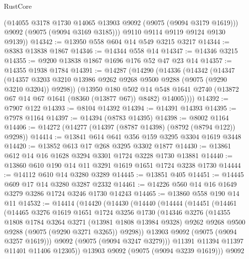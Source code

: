 \begin{lexlean}{RustCore}
\begin{coremodule}
          (@14055 @3178 @1730 @14065 @13903 @9092 (@9075 (@9094 @3179 @1619)))
          @9092
          (@9075 (@9094 @3169 @3185)))
        @9110
        @9114
        @9119
        @9124
        @9130
        @9139))
@14342 := @13950 @558 @604 @14 @549 @3215 @3217
@14344 := @8383 @13838 @1867
@14346 := @14344 @558 @14
@14347 := @14346 @3215
@14355 := @9200 @13838 @1867 @1696 @176 @52 @47 @23 @14
@14357 := @14355 @1938 @1784
@14391 := @14287
    (@14290
      (@14336
        (@14342
          (@14347
            (@14357 @3203 @3210 @13986 @9262 @9268 @9500 @9288 (@9075 (@9290 @3210 @3204)) @9298))
          (@13950
            @180
            @502
            @14
            @548
            @1641
            @2740
            (@13872 @67 @14 @67 @1641 (@8360 (@13877 @67)) @8482)
            @14005))))
@14392 := @7907 @122
@14393 := @8104 @14392
@14394 := @14391 @14393
@14395 := @7978 @1164
@14397 := @14394 (@8783 @14395)
@14398 := @8002 @1164
@14406 := @14272 (@14277 (@14397 (@8787 @14398) (@8792 (@8794 @122)) @9298))
@14414 := @13841 @614 @641 @356 @159 @3295 @3304 @1619 @3448
@14420 := @13852 @613 @17 @268 @3295 @3302 @1877
@14430 := @13861 @612 @14 @16 @1628 @3294 @3301 @1724 @3228 @1730 @13881
@14440 := @13860 @610 @190 @14 @11 @3291 @1619 @1651 @1724 @3238 @1730
@14444 := @14112 @610 @14 @3280 @3289
@14445 := @13851 @405
@14451 := @14445 @609 @17 @14 @3280 @3287 @2332
@14461 := @14226 @560 @14 @16 @1649 @3279 @3286 @1724 @3246 @1730 @14243
@14465 := @13860 @558 @190 @14 @11
@14532 := @14414
    (@14420
      (@14430
        (@14440
          (@14444
            (@14451
              (@14461
                (@14465
                  @3276
                  @1619
                  @1651
                  @1724
                  @3256
                  @1730
                  (@14346
                    @3276
                    (@14355
                      @1808
                      @1784
                      @3264
                      @3271
                      (@13981 @1808 @13984 @9328)
                      @9262
                      @9268
                      @9500
                      @9288
                      (@9075 (@9290 @3271 @3265))
                      @9298))
                  @13903
                  @9092
                  (@9075 (@9094 @3257 @1619)))
                @9092
                (@9075 (@9094 @3247 @3279)))
              @11391
              @11394
              @11397
              @11401
              @11406
              @12305))
          @13903
          @9092
          (@9075 (@9094 @3239 @1619)))
        @9092

\end{coremodule}
\end{lexlean}

